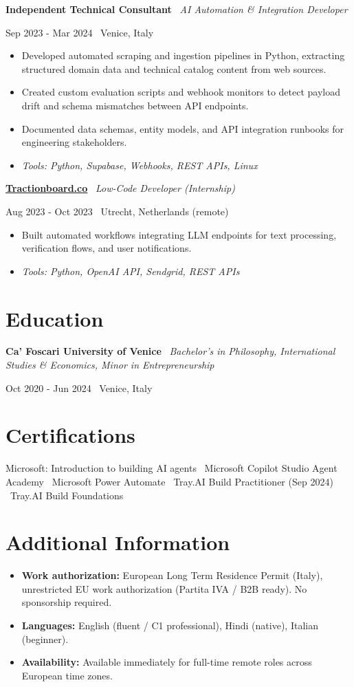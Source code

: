 \documentclass[a4paper,10pt]{article}
\newcommand{\role}[4]{%
 \vspace{2pt}\noindent
 \begin{minipage}[t]{0.70\textwidth}\raggedright\textbf{#1} \textbullet\ \textit{#3}\end{minipage}%
 \hfill
 \begin{minipage}[t]{0.28\textwidth}\raggedleft\footnotesize\color{gray}#2 \textbullet\ #4\end{minipage}%
 \vspace{1pt}%
}
\begin{document}
\role{Independent Technical Consultant}{Sep 2023 - Mar 2024}{AI Automation \& Integration Developer}{Venice, Italy}
\begin{itemize}
 \item Developed automated scraping and ingestion pipelines in Python, extracting structured domain data and technical catalog content from web sources.
 \item Created custom evaluation scripts and webhook monitors to detect payload drift and schema mismatches between API endpoints.
 \item Documented data schemas, entity models, and API integration runbooks for engineering stakeholders.
 \item \textit{Tools: Python, Supabase, Webhooks, REST APIs, Linux}
\end{itemize}

\role{\href{https://tractionboard.co}{Tractionboard.co}}{Aug 2023 - Oct 2023}{Low-Code Developer (Internship)}{Utrecht, Netherlands (remote)}
\begin{itemize}
 \item Built automated workflows integrating LLM endpoints for text processing, verification flows, and user notifications.
 \item \textit{Tools: Python, OpenAI API, Sendgrid, REST APIs}
\end{itemize}

\section{Education}
\role{Ca' Foscari University of Venice}{Oct 2020 - Jun 2024}{Bachelor's in Philosophy, International Studies \& Economics, Minor in Entrepreneurship}{Venice, Italy}

\section{Certifications}
Microsoft: Introduction to building AI agents \textbullet\ Microsoft Copilot Studio Agent Academy \textbullet\ Microsoft Power Automate \textbullet\ Tray.AI Build Practitioner (Sep 2024) \textbullet\ Tray.AI Build Foundations

\section{Additional Information}
\begin{itemize}
 \item \textbf{Work authorization:} European Long Term Residence Permit (Italy), unrestricted EU work authorization (Partita IVA / B2B ready). No sponsorship required.
 \item \textbf{Languages:} English (fluent / C1 professional), Hindi (native), Italian (beginner).
 \item \textbf{Availability:} Available immediately for full-time remote roles across European time zones.
\end{itemize}
\end{document}
